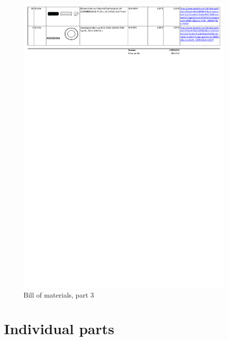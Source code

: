 \begin{figure}[H]
    \centering
    \includegraphics[trim=0 690 0 8,clip=true,width=0.97\textwidth]{fig/ch-rpi-hardware/3_Masterquad2015_BoM}
    \caption{Bill of materials, part 3}
    \label{fig:hardware:BillOfMat:3}
\end{figure}

\chapter{Individual parts}
\label{sec:parts}

